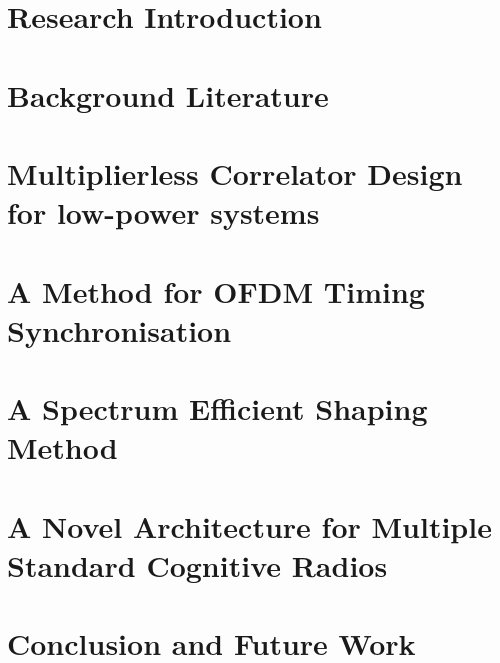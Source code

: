 \chapter{Research Introduction}
\label{chap:introduction}
%
\chapter{Background Literature}
\label{chap:BackgroundLiterature}
%
\chapter{Multiplierless Correlator Design for low-power systems}
\label{chap:multiplierlesscorrelator}
%
\chapter{A Method for OFDM Timing Synchronisation}
\label{chap:Synchronisation}



%
\chapter{A Spectrum Efficient Shaping Method}
\label{chap:SpectralLeakage}
%
\chapter{A Novel Architecture for Multiple Standard Cognitive Radios}
\label{chap:MSCR}
%
\chapter{Conclusion and Future Work}
\label{chap:conclusion}



\appendix
%

\newpage
{}








